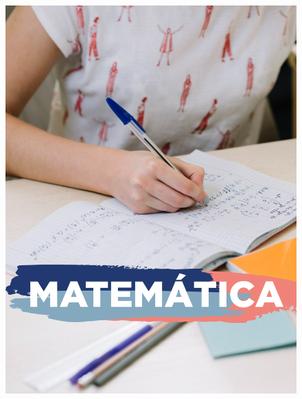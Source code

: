 \begin{figure}[htpb]
\vspace*{-2.5cm}
\hspace*{-2.5cm}\includegraphics[height=\paperheight]{../separadores/separadorMAT9A.png}
\end{figure}

